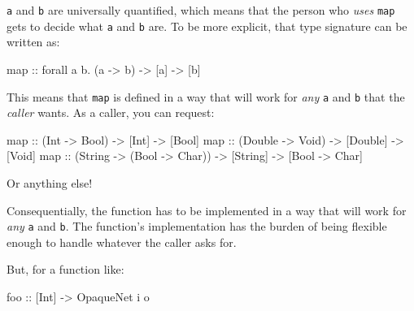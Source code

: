 \documentclass[]{article}
\newenvironment{Shaded}{}{}
\newcommand{\DataTypeTok}[1]{\textcolor[rgb]{0.56,0.13,0.00}{{#1}}}
\newcommand{\OtherTok}[1]{\textcolor[rgb]{0.00,0.44,0.13}{{#1}}}
\newcommand{\FunctionTok}[1]{\textcolor[rgb]{0.02,0.16,0.49}{{#1}}}
\newcommand{\NormalTok}[1]{{#1}}
\begin{document}
\texttt{a} and \texttt{b} are universally quantified, which means that the
person who \emph{uses} \texttt{map} gets to decide what \texttt{a} and
\texttt{b} are. To be more explicit, that type signature can be written as:

\begin{Shaded}
\begin{Highlighting}[]
\NormalTok{map}\OtherTok{ ::} \NormalTok{forall a b}\FunctionTok{.} \NormalTok{(a }\OtherTok{->} \NormalTok{b) }\OtherTok{->} \NormalTok{[a] }\OtherTok{->} \NormalTok{[b]}
\end{Highlighting}
\end{Shaded}

This means that \texttt{map} is defined in a way that will work for \emph{any}
\texttt{a} and \texttt{b} that the \emph{caller} wants. As a caller, you can
request:

\begin{Shaded}
\begin{Highlighting}[]
\NormalTok{map}\OtherTok{ ::} \NormalTok{(}\DataTypeTok{Int} \OtherTok{->} \DataTypeTok{Bool}\NormalTok{)    }\OtherTok{->} \NormalTok{[}\DataTypeTok{Int}\NormalTok{]    }\OtherTok{->} \NormalTok{[}\DataTypeTok{Bool}\NormalTok{]}
\NormalTok{map}\OtherTok{ ::} \NormalTok{(}\DataTypeTok{Double} \OtherTok{->} \DataTypeTok{Void}\NormalTok{) }\OtherTok{->} \NormalTok{[}\DataTypeTok{Double}\NormalTok{] }\OtherTok{->} \NormalTok{[}\DataTypeTok{Void}\NormalTok{]}
\NormalTok{map}\OtherTok{ ::} \NormalTok{(}\DataTypeTok{String} \OtherTok{->} \NormalTok{(}\DataTypeTok{Bool} \OtherTok{->} \DataTypeTok{Char}\NormalTok{)) }\OtherTok{->} \NormalTok{[}\DataTypeTok{String}\NormalTok{] }\OtherTok{->} \NormalTok{[}\DataTypeTok{Bool} \OtherTok{->} \DataTypeTok{Char}\NormalTok{]}
\end{Highlighting}
\end{Shaded}

Or anything else!

Consequentially, the function has to be implemented in a way that will work for
\emph{any} \texttt{a} and \texttt{b}. The function's implementation has the
burden of being flexible enough to handle whatever the caller asks for.

But, for a function like:

\begin{Shaded}
\begin{Highlighting}[]
\OtherTok{foo ::} \NormalTok{[}\DataTypeTok{Int}\NormalTok{] }\OtherTok{->} \DataTypeTok{OpaqueNet} \NormalTok{i o}
\end{Highlighting}
\end{Shaded}
\end{document}
